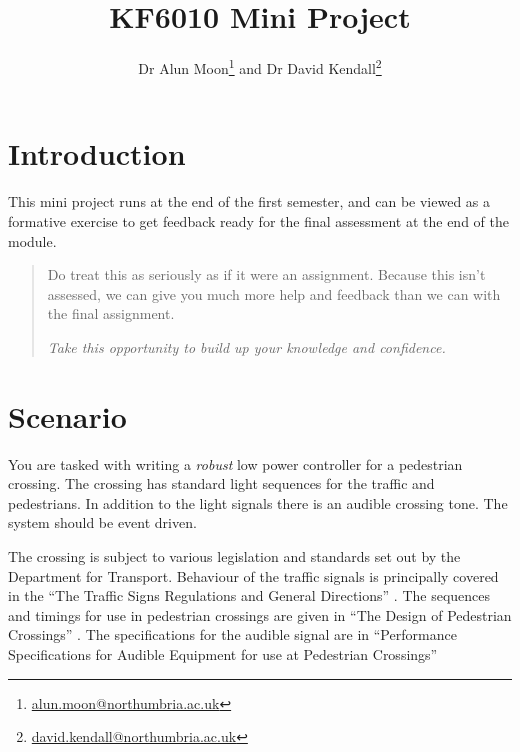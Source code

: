 \documentclass{article}
\title{KF6010 Mini Project}
\author{Dr Alun Moon\thanks{\url{alun.moon@northumbria.ac.uk}} and
Dr David Kendall\thanks{\url{david.kendall@northumbria.ac.uk}}}
\begin{document}
\maketitle

\begin{abstract}
\end{abstract}

\section{Introduction}
	This mini project runs at the end of the first semester, and can be viewed
	as a formative exercise to get feedback ready for the final assessment at
	the end of the module.
	\begin{quote}
		Do treat this as seriously as if it were an assignment.
		Because this isn't assessed, we can give you much more help and
		feedback than we can with the final assignment.  

		\emph{Take this opportunity to build up your knowledge and confidence.}
	\end{quote}

\section{Scenario}
You are tasked with writing a \emph{robust} low power controller for a
pedestrian crossing.  The crossing has standard light sequences for the
traffic and pedestrians.  In addition to the light signals there is an audible
crossing tone.  The system should be event driven.

The crossing is subject to various legislation and standards set out by the
Department for Transport.  Behaviour of the traffic signals is principally
covered in the ``The Traffic Signs Regulations and General Directions''
\citep{tsrgd}.  The sequences and timings for use in pedestrian crossings are
given in ``The Design of Pedestrian Crossings'' \citep{dps}.  The
specifications for the audible signal are in ``Performance Specifications for
Audible Equipment for use at Pedestrian Crossings''\citep{psaepc}
\end{document}
